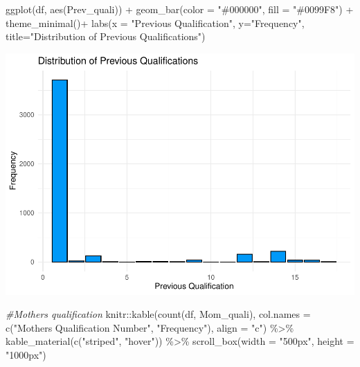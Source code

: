 \documentclass[
]{article}
\newenvironment{Shaded}{\begin{snugshade}}{\end{snugshade}}
\newcommand{\AttributeTok}[1]{\textcolor[rgb]{0.77,0.63,0.00}{#1}}
\newcommand{\CommentTok}[1]{\textcolor[rgb]{0.56,0.35,0.01}{\textit{#1}}}
\newcommand{\FunctionTok}[1]{\textcolor[rgb]{0.00,0.00,0.00}{#1}}
\newcommand{\NormalTok}[1]{#1}
\newcommand{\SpecialCharTok}[1]{\textcolor[rgb]{0.00,0.00,0.00}{#1}}
\newcommand{\StringTok}[1]{\textcolor[rgb]{0.31,0.60,0.02}{#1}}
\begin{document}
\begin{Shaded}
\begin{Highlighting}[]
\FunctionTok{ggplot}\NormalTok{(df, }\FunctionTok{aes}\NormalTok{(Prev\_quali)) }\SpecialCharTok{+}
  \FunctionTok{geom\_bar}\NormalTok{(}\AttributeTok{color =} \StringTok{"\#000000"}\NormalTok{, }\AttributeTok{fill =} \StringTok{"\#0099F8"}\NormalTok{) }\SpecialCharTok{+} \FunctionTok{theme\_minimal}\NormalTok{()}\SpecialCharTok{+}
  \FunctionTok{labs}\NormalTok{(}\AttributeTok{x =} \StringTok{"Previous Qualification"}\NormalTok{, }\AttributeTok{y=}\StringTok{"Frequency"}\NormalTok{, }\AttributeTok{title=}\StringTok{"Distribution of Previous Qualifications"}\NormalTok{)}
\end{Highlighting}
\end{Shaded}

\includegraphics{midterm_files/figure-latex/unnamed-chunk-8-1.pdf}

\begin{Shaded}
\begin{Highlighting}[]
\CommentTok{\#Mother\textquotesingle{}s qualification}
\NormalTok{knitr}\SpecialCharTok{::}\FunctionTok{kable}\NormalTok{(}\FunctionTok{count}\NormalTok{(df, }\StringTok{\textquotesingle{}Mom\_quali\textquotesingle{}}\NormalTok{), }\AttributeTok{col.names =} \FunctionTok{c}\NormalTok{(}\StringTok{"Mother\textquotesingle{}s Qualification Number"}\NormalTok{, }\StringTok{"Frequency"}\NormalTok{), }\AttributeTok{align =} \StringTok{"c"}\NormalTok{) }\SpecialCharTok{\%\textgreater{}\%}
  \FunctionTok{kable\_material}\NormalTok{(}\FunctionTok{c}\NormalTok{(}\StringTok{"striped"}\NormalTok{, }\StringTok{"hover"}\NormalTok{)) }\SpecialCharTok{\%\textgreater{}\%} 
 \FunctionTok{scroll\_box}\NormalTok{(}\AttributeTok{width =} \StringTok{"500px"}\NormalTok{, }\AttributeTok{height =} \StringTok{"1000px"}\NormalTok{)}
\end{Highlighting}
\end{Shaded}
\end{document}
